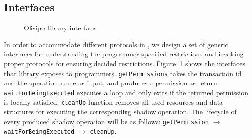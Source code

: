 

\subsection{Interfaces}
\begin{figure}[t!]
\centering
{}
\caption{Olisipo library interface}
\label{fig:por:olisipinterface}
\end{figure}
In order to accommodate different protocols in \coordtool, we design a set of generic interfaces
for understanding the programmer specified restrictions and invoking proper protocols for ensuring
decided restrictions. Figure~\ref{fig:por:olisipinterface} shows the interfaces that library exposes to programmers. 
{\tt getPermissions} takes the transaction id and the operation name as input, and produces a permission as return.
{\tt waitForBeingExecuted} executes a loop and only exits if the returned permission is locally satisfied. {\tt cleanUp}
function removes all used resources and data structures for executing the corresponding shadow operation. The lifecycle of
every produced shadow operation will be as follows: {\tt getPermission} $\rightarrow$ {\tt waitForBeingExecuted} $\rightarrow$ {\tt cleanUp}.



